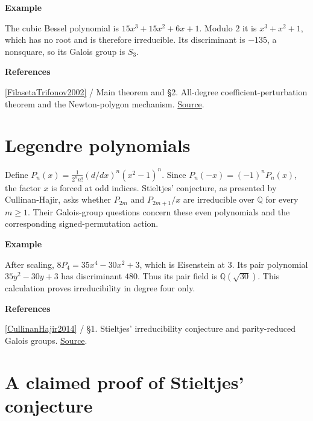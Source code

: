 \documentclass[11pt,a4paper,oneside,openany]{book}
\newenvironment{sources}{\par\smallskip\begingroup\footnotesize\color{atlasgray}\leftskip=10pt\setlength{\parskip}{2pt}}{\par\endgroup\smallskip}
\begin{document}
\begin{atlasblock}[standard]
\textbf{\sffamily Example}\par\smallskip
\color{black} The cubic Bessel polynomial is \(15x^3+15x^2+6x+1\). Modulo \(2\) it is \(x^3+x^2+1\), which has no root and is therefore irreducible. Its discriminant is \(-135\), a nonsquare, so its Galois group is \(S_3\).\par
\end{atlasblock}\color{black}
\begin{sources}
\textbf{References}\par\smallskip
\noindent\hyperlink{ref:FilasetaTrifonov2002}{[FilasetaTrifonov2002]} / Main theorem and §2. All-degree coefficient-perturbation theorem and the Newton-polygon mechanism. \href{https://doi.org/10.1515/crll.2002.069}{Source}.\par
\end{sources}\color{black}
\section{Legendre polynomials}
\color{black} Define \(P_n(x)=\frac1{2^n n!}(d/dx)^n(x^2-1)^n\). Since \(P_n(-x)=(-1)^nP_n(x)\), the factor \(x\) is forced at odd indices. Stieltjes' conjecture, as presented by Cullinan-Hajir, asks whether \(P_{2m}\) and \(P_{2m+1}/x\) are irreducible over \(\mathbb Q\) for every \(m\ge1\). Their Galois-group questions concern these even polynomials and the corresponding signed-permutation action.\par

\begin{atlasblock}[standard]
\textbf{\sffamily Example}\par\smallskip
\color{black} After scaling, \(8P_4=35x^4-30x^2+3\), which is Eisenstein at \(3\). Its pair polynomial \(35y^2-30y+3\) has discriminant \(480\). Thus its pair field is \(\mathbb Q(\sqrt{30})\). This calculation proves irreducibility in degree four only.\par
\end{atlasblock}\color{black}
\begin{sources}
\textbf{References}\par\smallskip
\noindent\hyperlink{ref:CullinanHajir2014}{[CullinanHajir2014]} / §1. Stieltjes' irreducibility conjecture and parity-reduced Galois groups. \href{https://doi.org/10.1016/j.indag.2014.01.004}{Source}.\par
\end{sources}\color{black}
\section{A claimed proof of Stieltjes' conjecture}
\end{document}
